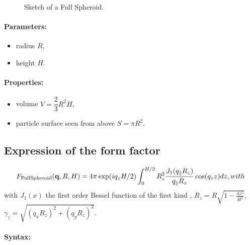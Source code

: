 \begin{figure}[ht]
\begin{center}
\caption{Sketch of a Full Spheroid. }
\end{center}
\label{fullspheroid}
\end{figure}


\paragraph{Parameters:}
\begin{itemize}
\item radius $R$,
\item height $H$.
\end{itemize}

\paragraph{Properties:}
\begin{itemize}
\item volume $V =\dfrac{2}{3}R^2H$,
\item particle surface seen from above $S =\pi R^2$. 
\end{itemize}

\subsection{Expression of the form factor}
\begin{equation*}
F_{\rm{FullSpheroid}}(\mathbf{q}, R, H) = 4\pi \exp(i q_z H/2) \int_0 ^{H/2}R_z ^2
\frac{J_1(q_{\parallel}R_z)}{q_{\parallel}R_z} \cos(q_z z) dz,
with 
\end{equation*}
with $J_1(x)$ the first order
Bessel function of the first kind \cite{AbSt64},
$R_z = R\sqrt{1-\frac{4z^2}{H^2}}$, $\gamma_z = \sqrt{(q_x R_z)^2+(q_y R_z)^2}$.


\paragraph{Syntax:} 

